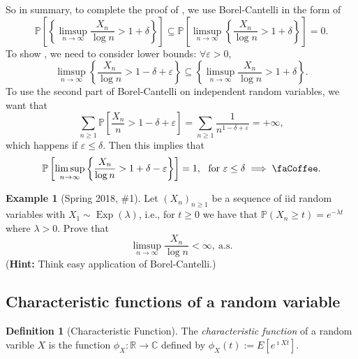 \documentclass[12pt,reqno]{article}
\renewcommand{\emph}[1]{\textit{#1}}
\theoremstyle{plain}
\theoremstyle{definition}
\newtheorem{definition}[theorem]{Definition}
\newtheorem{example}[theorem]{Example}
\newcommand{\PP}[1]{\ensuremath{\mathbb{P}\left(#1\right)}}
\begin{document}
So in summary, to complete the proof of \faLinux, we use Borel-Cantelli in the form of 
\[
\mathbb{P}\left[\left\{\limsup_{n \rightarrow \infty} \frac{X_n}{\log n} > 1+\delta\right\}\right] \subseteq 
     \mathbb{P}\left[\limsup_{n \rightarrow \infty} \left\{\frac{X_n}{\log n} > 1 + \delta\right\}\right] = 0. 
\]
To show \faCoffee, we need to consider lower bounds: $\forall \varepsilon > 0$, 
\[
\limsup_{n \rightarrow \infty} \left\{\frac{X_n}{\log n} > 1-\delta+\varepsilon\right\} \subseteq 
     \left\{\limsup_{n \rightarrow \infty} \frac{X_n}{\log n} > 1 + \delta\right\}. 
\]
To use the second part of Borel-Cantelli on independent random variables, we want that 
\[
\sum_{n \geq 1} \mathbb{P}\left[\frac{X_n}{n} > 1-\delta+\varepsilon\right] = \sum_{n \geq 1} 
     \frac{1}{n^{1-\delta+\varepsilon}} = +\infty, 
\]
which happens if $\varepsilon \leq \delta$. Then this implies that 
\[
\mathbb{P}\left[\limsup_{n \rightarrow \infty} \left\{\frac{X_n}{\log n} > 1+\delta-\varepsilon\right\} 
     \right] = 1,\ \text{ for } \varepsilon \leq \delta \implies \text{\faCoffee}. 
\] 

\begin{example}[Spring 2018, \#1]
Let $(X_n)_{n \geq 1}$ be a sequence of iid random variables with 
$X_1 \sim \operatorname{Exp}(\lambda)$, i.e., for $t \geq 0$ we have that 
$\PP{X_n \geq t} = e^{-\lambda t}$ where $\lambda > 0$. Prove that 
\[
\limsup_{n \rightarrow \infty} \frac{X_n}{\log n} < \infty,\ \text{a.s.}
\] 
(\textbf{Hint:} Think easy application of Borel-Cantelli.) 
\end{example} 

\subsection{Characteristic functions of a random variable} 

\begin{definition}[Characteristic Function]
The \emph{characteristic function} of a random varible $X$ is the 
function $\phi_X: \mathbb{R} \rightarrow \mathbb{C}$ defined by 
$\phi_X(t) := E[e^{\imath Xt}]$. 
\end{definition} 
\end{document}

